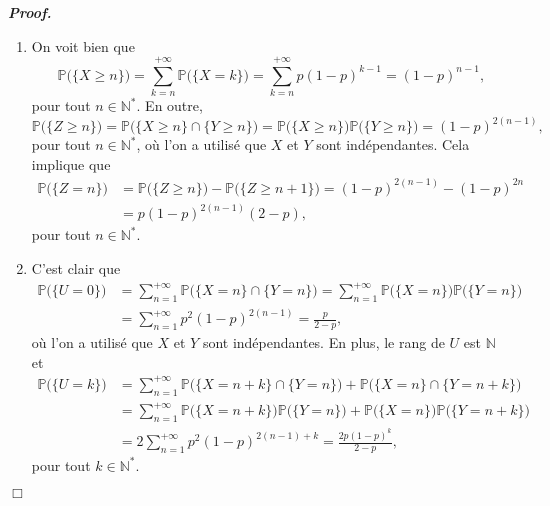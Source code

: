\documentclass[11pt,a4paper]{article}
\newcommand{\NN}{\mathbb{N}}
\newenvironment{preuve}[1][]
{\vskip 2mm  \noindent\emph{\bf Proof#1. }}{$\Box$ \vskip 2mm}
\let\geq\geqslant
\begin{document}
		\begin{preuve}
			\begin{enumerate}
				\item On voit bien que 
				\[     \mathbb{P}\big(\{X \geq n\}\big) = \sum_{k=n}^{+ \infty} \mathbb{P}\big(\{ X = k \}\big) = \sum_{k=n}^{+ \infty} p (1-p)^{k-1} = (1-p)^{n-1},      \]
				pour tout $n \in \NN^{*}$.
				En outre, 
				\[     \mathbb{P}\big(\{Z \geq n\}\big) = \mathbb{P}\big(\{X \geq n\} \cap \{Y \geq n\}\big) = \mathbb{P}\big(\{X \geq n\}\big)  \mathbb{P}\big(\{Y \geq n\}\big) = (1-p)^{2(n-1)},      \]
				pour tout $n \in \NN^{*}$, où l'on a utilisé que $X$ et $Y$ sont indépendantes. 
				Cela implique que 
				\begin{align*}
				\mathbb{P}\big(\{Z = n\}\big) &= \mathbb{P}\big(\{Z \geq n\}\big) - \mathbb{P}\big(\{Z \geq n+1 \}\big) = (1-p)^{2(n-1)} - (1-p)^{2 n} 
				\\
				&= p (1-p)^{2(n-1)} (2-p),      
				\end{align*}
				pour tout $n \in \NN^{*}$. 
				
				\item C'est clair que  
				\begin{align*}
				\mathbb{P}\big(\{ U = 0 \}\big) &= \sum_{n=1}^{+ \infty} \mathbb{P}\big(\{X = n\} \cap \{Y = n\}\big) = \sum_{n=1}^{+ \infty} \mathbb{P}\big(\{X = n\}\big) \mathbb{P}\big(\{Y = n\}\big) 
				\\
				&= \sum_{n=1}^{+ \infty} p^{2} (1-p)^{2(n-1)} = \frac{p}{2-p},      
				\end{align*}
				où l'on a utilisé que $X$ et $Y$ sont indépendantes. 
				En plus, le rang de $U$ est $\NN$ et 
				\begin{align*}
				\mathbb{P}\big(\{ U = k \}\big) &= \sum_{n=1}^{+ \infty} \mathbb{P}\big(\{X = n + k \} \cap \{Y = n\}\big) + \mathbb{P}\big(\{X = n \} \cap \{Y = n + k\}\big)  
				\\
				&= \sum_{n=1}^{+ \infty} \mathbb{P}\big(\{X = n+k\}\big) \mathbb{P}\big(\{Y = n\}\big) + \mathbb{P}\big(\{X = n\}\big) \mathbb{P}\big(\{Y = n + k\}\big) 
				\\
				&= 2 \sum_{n=1}^{+ \infty} p^{2} (1-p)^{2(n-1)+k} = \frac{2 p (1-p)^{k}}{2-p},      
				\end{align*}
				pour tout $k \in \NN^{*}$. 
				

\end{enumerate}
\end{preuve}
\end{document}
